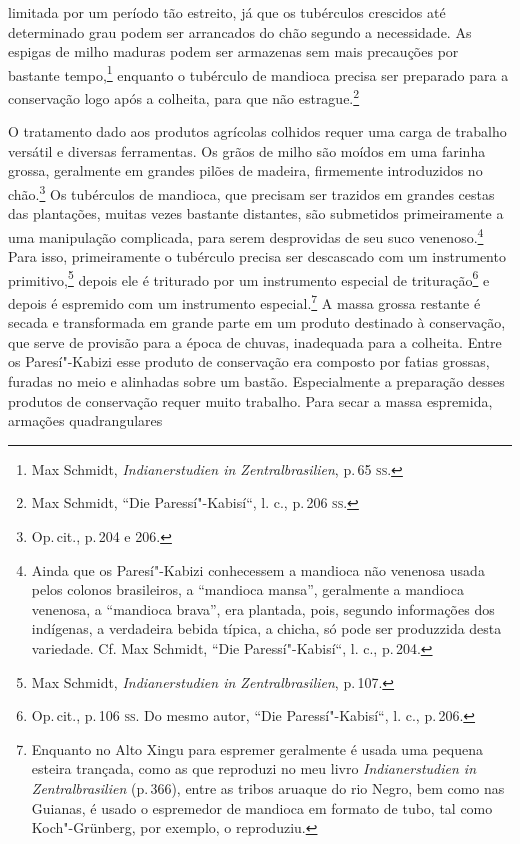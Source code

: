 limitada por um período tão estreito, já que os tubérculos crescidos até
determinado grau podem ser arrancados do chão segundo a necessidade. As
espigas de milho maduras podem ser armazenas sem mais precauções por
bastante tempo,\footnote{Max Schmidt, \textit{Indianerstudien in
  Zentralbrasilien}, p.\,65 \textsc{ss}.} enquanto o tubérculo de mandioca
precisa ser preparado para a conservação logo após a colheita, para que
não estrague.\footnote{Max Schmidt, ``Die Paressí"-Kabisí``, l. c., p.\,206
  \textsc{ss}.}

O tratamento dado aos produtos agrícolas colhidos requer uma carga de
trabalho versátil e diversas ferramentas. Os grãos de milho são moídos
em uma farinha grossa, geralmente em grandes pilões de madeira,
firmemente introduzidos no chão.\footnote{Op.\,cit., p.\,204 e 206.} Os
tubérculos de mandioca, que precisam ser trazidos em grandes cestas das
plantações, muitas vezes bastante distantes, são submetidos
primeiramente a uma manipulação complicada, para serem desprovidas de
seu suco venenoso.\footnote{Ainda que os Paresí"-Kabizi conhecessem a
  mandioca não venenosa usada pelos colonos brasileiros, a ``mandioca
  mansa'', geralmente a mandioca venenosa, a ``mandioca brava'', era
  plantada, pois, segundo informações dos indígenas, a verdadeira bebida
  típica, a chicha, só pode ser produzzida desta variedade. Cf. Max
  Schmidt, ``Die Paressí"-Kabisí``, l. c., p.\,204.} Para isso,
primeiramente o tubérculo precisa ser descascado com um instrumento
primitivo,\footnote{Max Schmidt, \textit{Indianerstudien in
  Zentralbrasilien}, p.\,107.} depois ele é triturado por um instrumento
especial de trituração\footnote{Op.\,cit., p.\,106 \textsc{ss}. Do mesmo autor,
  ``Die Paressí"-Kabisí``, l. c., p.\,206.} e depois é espremido com um
instrumento especial.\footnote{Enquanto no Alto Xingu para espremer
  geralmente é usada uma pequena esteira trançada, como as que reproduzi
  no meu livro \textit{Indianerstudien in Zentralbrasilien} (p.\,366),
  entre as tribos aruaque do rio Negro, bem como nas Guianas, é usado o
  espremedor de mandioca em formato de tubo, tal como Koch"-Grünberg, por
  exemplo, o reproduziu.} A massa grossa restante é secada e
transformada em grande parte em um produto destinado à conservação,
que serve de provisão para a época de chuvas, inadequada para a
colheita. Entre os Paresí"-Kabizi esse produto de conservação era
composto por fatias grossas, furadas no meio e alinhadas sobre um
bastão. Especialmente a preparação desses produtos de conservação requer
muito trabalho. Para secar a massa espremida, armações quadrangulares
